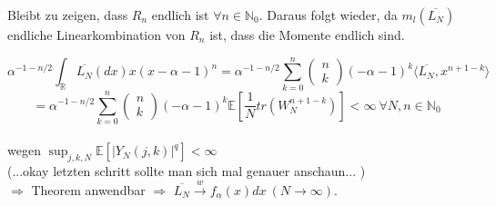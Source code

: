 \documentclass[a4paper, 11pt]{scrreprt}
\newcommand{\RR}{\mathbb{R}}
\newcommand{\EE}{\mathbb{E}}
\newcommand{\NN}{\mathbb{N}}
\begin{document}
Bleibt zu zeigen, dass $ R_n $ endlich ist $ \forall n \in \NN_0 $. Daraus folgt wieder, da $ m_l(\overline{L_N}) $ endliche Linearkombination von $R_n$ ist, dass die Momente endlich sind.

 \[ \alpha^{-1-n/2} \int_{\RR}\overline{L_{N}}(dx)x(x-\alpha-1)^{n} = \alpha^{-1-n/2}\sum_{k=0}^n \begin{pmatrix} n\\k\end{pmatrix} (-\alpha -1)^k \langle \overline{L_N}, x^{n+1-k} \rangle \] 
\[= \alpha^{-1-n/2}\sum_{k=0}^n \begin{pmatrix} n\\k\end{pmatrix} (-\alpha -1)^k \EE [\dfrac{1}{N} tr(W_N^{n+1-k})]
< \infty ~\forall N,n \in \NN_0 \]\\
wegen $ \sup_{j,k,N} \EE[\vert Y_N(j,k)\vert ^{q}]< \infty$ \\
(...okay letzten schritt sollte man sich mal genauer anschaun... )\\
$ \Rightarrow $ Theorem anwendbar $ \Rightarrow $  $ \overline{L_N} \overset{w}{\rightarrow} f_\alpha (x)dx~(N \rightarrow \infty) $. \\
\end{document}
